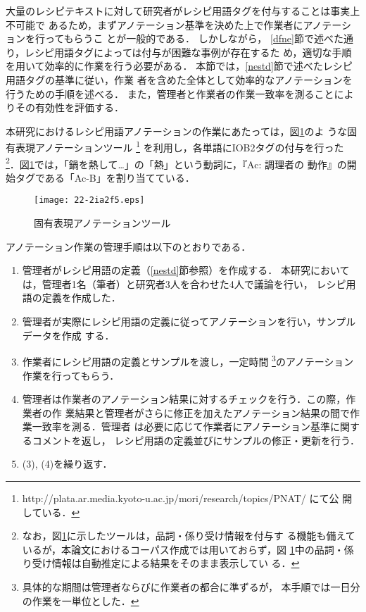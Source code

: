 \documentclass[japanese]{jnlp_1.4}
\begin{document}
大量のレシピテキストに対して研究者がレシピ用語タグを付与することは事実上不可能で
あるため，まずアノテーション基準を決めた上で作業者にアノテーションを行ってもらうこ
とが一般的である．
しかしながら，
\ref{dfne}節で述べた通り，レシピ用語タグによっては付与が困難な事例が存在するた
め，適切な手順を用いて効率的に作業を行う必要がある．
本節では，\ref{nestd}節で述べたレシピ用語タグの基準に従い，作業
者を含めた全体として効率的なアノテーションを行うための手順を述べる．
また，管理者と作業者の作業一致率を測ることによりその有効性を評価する．

本研究におけるレシピ用語アノテーションの作業にあたっては，図\ref{figure_0002}のよ
うな固有表現アノテーションツール
\footnote{http://plata.ar.media.kyoto-u.ac.jp/mori/research/topics/PNAT/ にて公
開している．} 
を利用し，各単語にIOB2タグの付与を行った
\footnote{なお，図\ref{figure_0002}に示したツールは，品詞・係り受け情報を付与す
る機能も備えているが，本論文におけるコーパス作成では用いておらず，図
\ref{figure_0002}中の品詞・係り受け情報は自動推定による結果をそのまま表示してい
る．}．図\ref{figure_0002}では，「鍋を熱して…」の「熱」という動詞に，『Ac: 調理者の
動作』の開始タグである「Ac-B」を割り当てている．

\begin{figure}[b]
  \begin{center}
\texttt{[image: 22-2ia2f5.eps]}
  \end{center}
  \caption{固有表現アノテーションツール}
  \label{figure_0002}
\end{figure}

アノテーション作業の管理手順は以下のとおりである．
\begin{enumerate}
\item 管理者がレシピ用語の定義（\ref{nestd}節参照）を作成する．
      本研究においては，管理者1名（筆者）と研究者3人を合わせた4人で議論を行い，
      レシピ用語の定義を作成した．
\item 管理者が実際にレシピ用語の定義に従ってアノテーションを行い，サンプルデータを作成
  する．
\item 作業者にレシピ用語の定義とサンプルを渡し，一定時間
   \footnote{具体的な期間は管理者ならびに作業者の都合に準ずるが，
      本手順では一日分の作業を一単位とした．}のアノテーション作業を行ってもらう．
\item 管理者は作業者のアノテーション結果に対するチェックを行う．この際，作業者の作
  業結果と管理者がさらに修正を加えたアノテーション結果の間で作業一致率を測る．管理者
  は必要に応じて作業者にアノテーション基準に関するコメントを返し，
      レシピ用語の定義並びにサンプルの修正・更新を行う．
\item (3), (4)を繰り返す．
\end{enumerate}
\end{document}
